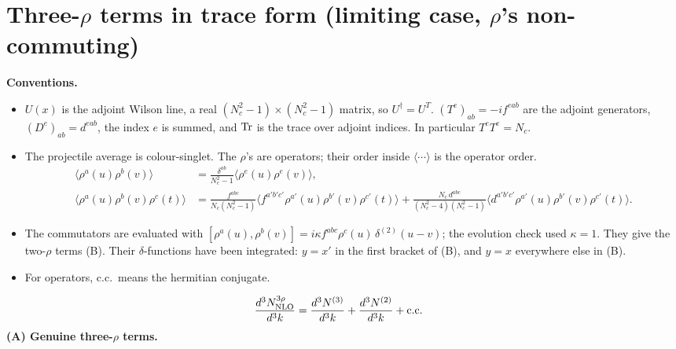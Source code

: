 \documentclass[10pt]{article}
\begin{document}
\section*{Three-$\rho$ terms in trace form (limiting case, $\rho$'s non-commuting)}
\noindent\textbf{Conventions.}
\begin{itemize}
\item $U(x)$ is the adjoint Wilson line, a real $(N_{c}^{2}-1)\times(N_{c}^{2}-1)$ matrix, so $U^{\dagger}=U^{T}$. $(T^{e})_{ab}=-if^{eab}$ are the adjoint generators, $(D^{e})_{ab}=d^{eab}$, the index $e$ is summed, and ${\rm Tr}$ is the trace over adjoint indices. In particular $T^{e}T^{e}=N_{c}$.
\item The projectile average is colour-singlet. The $\rho$'s are operators; their order inside $\langle\cdots\rangle$ is the operator order.
\begin{align*}
\langle\rho^{a}(u)\rho^{b}(v)\rangle&=\frac{\delta^{ab}}{N_{c}^{2}-1}\langle\rho^{e}(u)\rho^{e}(v)\rangle,\\
\langle\rho^{a}(u)\rho^{b}(v)\rho^{c}(t)\rangle&=\frac{f^{abc}}{N_{c}(N_{c}^{2}-1)}\langle f^{a'b'c'}\rho^{a'}(u)\rho^{b'}(v)\rho^{c'}(t)\rangle+\frac{N_{c}\,d^{abc}}{(N_{c}^{2}-4)(N_{c}^{2}-1)}\langle d^{a'b'c'}\rho^{a'}(u)\rho^{b'}(v)\rho^{c'}(t)\rangle.
\end{align*}
\item The commutators are evaluated with $[\rho^{a}(u),\rho^{b}(v)]=i\kappa f^{abc}\rho^{c}(u)\,\delta^{(2)}(u-v)$; the evolution check used $\kappa=1$. They give the two-$\rho$ terms (B). Their $\delta$-functions have been integrated: $y=x'$ in the first bracket of (B), and $y=x$ everywhere else in (B).
\item For operators, c.c.\ means the hermitian conjugate.
\end{itemize}
\begin{align}
\frac{d^{3}N^{3\rho}_{\rm NLO}}{d^{3}k}&=\frac{d^{3}N^{(3)}}{d^{3}k}+\frac{d^{3}N^{(2)}}{d^{3}k}+{\rm c.c.}
\end{align}
\textbf{(A) Genuine three-$\rho$ terms.}
\end{document}
